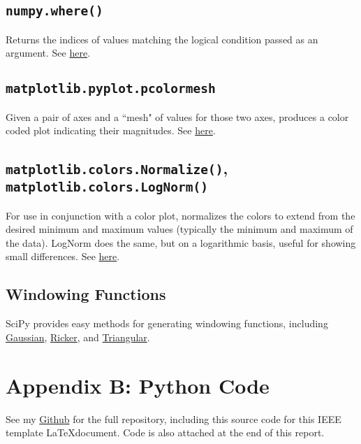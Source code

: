 \documentclass[journal]{IEEEtran}
\def\code#1{\texttt{#1}}
\begin{document}
\subsection{\code{numpy.where()}}
Returns the indices of values matching the logical condition passed as an argument. See
\href{https://docs.scipy.org/doc/numpy/reference/generated/numpy.where.html}{here}.

\subsection{\code{matplotlib.pyplot.pcolormesh}}
Given a pair of axes and a ``mesh" of values for those two axes, produces a color coded plot indicating their magnitudes.
See \href{https://matplotlib.org/api/_as_gen/matplotlib.pyplot.pcolormesh.html}{here}.

\subsection{\code{matplotlib.colors.Normalize()}, \code{matplotlib.colors.LogNorm()}}
For use in conjunction with a color plot, normalizes the colors to extend from the desired minimum
and maximum values (typically the minimum and maximum of the data). LogNorm does the same, but on a
logarithmic basis, useful for showing small differences. See \href{https://matplotlib.org/tutorials/colors/colormapnorms.html}{here}.

\subsection{Windowing Functions}
SciPy provides easy methods for generating windowing functions, including \href{https://docs.scipy.org/doc/scipy-1.0.0/reference/generated/scipy.signal.gaussian.html}{Gaussian},
\href{https://docs.scipy.org/doc/scipy/reference/generated/scipy.signal.ricker.html}{Ricker}, and
\href{https://docs.scipy.org/doc/scipy-0.14.0/reference/generated/scipy.signal.triang.html}{Triangular}.


\newpage
\clearpage
\newpage
\section{Appendix B: Python Code}
See my \href{https://github.com/eric-silk/AMATH582_HW2}{Github} for the full repository, including this source code for this IEEE template \LaTeX document. Code is also attached at the end of this report.
\end{document}
